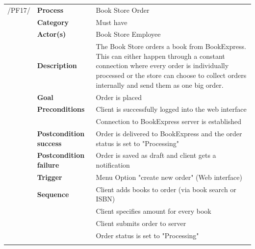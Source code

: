 \documentclass[11pt,a4paper,oneside,svgnames]{report}
\begin{document}
\noindent
\begin{tabular}{p{1.5cm}p{3cm}p{8cm}}
\cellcolor{white}/PF17/	& \textbf{Process} & Book Store Order\\ 
\cellcolor{white}		& \textbf{Category} & Must have\\
\cellcolor{white}		& \textbf{Actor(s)} & Book Store Employee\\ 
\cellcolor{white}		& \textbf{Description}	 & The Book Store orders a book from BookExpress.
This can either happen through a constant connection where every order is individually processed or the store can choose to collect orders internally and send them
as one big order.\\ 
\cellcolor{white}		& \textbf{Goal} & Order is placed\\
\cellcolor{white}		& \textbf{Preconditions} & Client is successfully logged into the web interface\\
\cellcolor{white}		& & Connection to BookExpress server is established\\
\cellcolor{white}		& \textbf{Postcondition success} & Order is delivered to BookExpress  and the order status is set to "Processing"\\
\cellcolor{white}		& \textbf{Postcondition failure} & Order is saved as draft and client gets a notification\\
\cellcolor{white}		& \textbf{Trigger} & Menu Option "create new order" (Web interface)\\
\cellcolor{white}		& \textbf{Sequence} & Client adds books to order (via book search or ISBN)\\
\cellcolor{white}		& & Client specifies amount for every book\\
\cellcolor{white}		& & Client submits order to server\\
\cellcolor{white}		& & Order status is set to "Processing"\\
\cellcolor{white}\hfill \\
\end{tabular}
\end{document}
